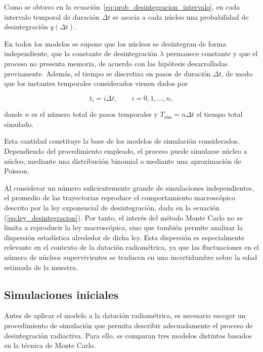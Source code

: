 \documentclass[12pt,a4paper]{article}
\newcommand{\refmargen}[2]{%
  \marginnote{%
    \makebox[\marginparwidth][l]{%
      \parbox[t]{1.7cm}{%
        \scriptsize\raggedright\textbf{#1}\\[-0.2em] #2%
      }%
    }%
  }%
}
\begin{document}
Como se obtuvo en la ecuación~\eqref{eq:prob_desintegracion_intervalo}, en cada intervalo temporal de duración $\Delta t$ se asocia a cada núcleo una probabilidad de desintegración $q(\Delta t)$.

En todos los modelos se supone que los núcleos se desintegran de forma independiente, que la constante de desintegración $\lambda$ permanece constante y que el proceso no presenta memoria, de acuerdo con las hipótesis desarrolladas previamente. Además, el tiempo se discretiza en pasos de duración $\Delta t$, de modo que los instantes temporales considerados vienen dados por

\begin{equation}
    t_i=i\Delta t,
    \qquad i=0,1,\ldots,n,
\end{equation}

donde $n$ es el número total de pasos temporales y $T_{\mathrm{sim}}=n\Delta t$ el tiempo total simulado.

Esta cantidad constituye la base de los modelos de simulación considerados. Dependiendo del procedimiento empleado, el proceso puede simularse núcleo a núcleo, mediante una distribución binomial o mediante una aproximación de Poisson.

Al considerar un número suficientemente grande de simulaciones independientes, el promedio de las trayectorias reproduce el comportamiento macroscópico descrito por la ley exponencial de desintegración, dada en la ecuación (\ref{eq:ley_desintegracion}). Por tanto, el interés del método Monte Carlo no se limita a reproducir la ley macroscópica, sino que también permite analizar la dispersión estadística alrededor de dicha ley. Esta dispersión es especialmente relevante en el contexto de la datación radiométrica, ya que las fluctuaciones en el número de núcleos supervivientes se traducen en una incertidumbre sobre la edad estimada de la muestra. \refmargen{Kazkaz y Walsh \cite{kazkaz2011}}{\S~II}



\subsection{Simulaciones iniciales}
\label{sec:simulaciones_iniciales}
Antes de aplicar el modelo a la datación radiométrica, es necesario escoger un procedimiento de simulación que permita describir adecuadamente el proceso de desintegración radiactiva. Para ello, se comparan tres modelos distintos basados en la técnica de Monte Carlo.
\end{document}
